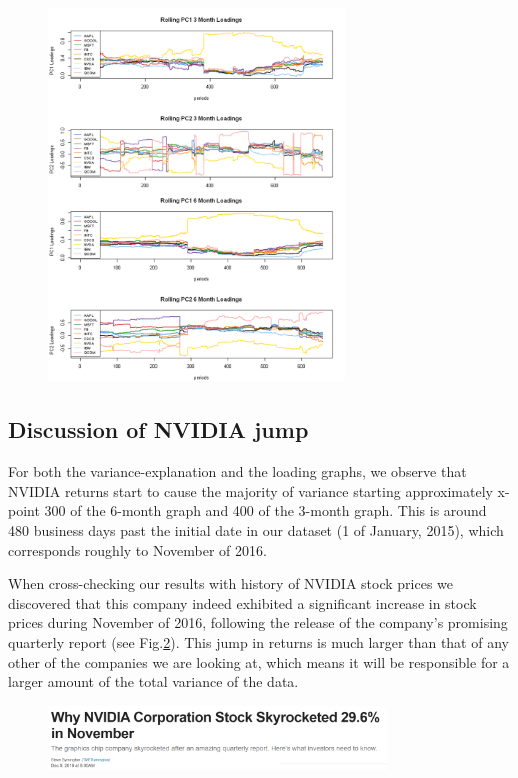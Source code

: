 \documentclass{article}
\begin{document}
\begin{figure}[H]
\caption{}
\centering
\includegraphics[width=0.7\textwidth]{36mload.png}
\label{3-6monthLoading}
\end{figure}


\subsection{Discussion of NVIDIA jump}

For both the variance-explanation and the loading graphs,  we observe that NVIDIA returns start to cause the majority of variance starting approximately x-point 300 of the 6-month graph and 400 of the 3-month graph. This is around 480 business days past the initial date in our dataset (1 of January, 2015), which corresponds roughly to November of 2016. 


When cross-checking our results with history of NVIDIA stock prices we discovered that this company indeed exhibited a significant increase in stock prices during November of 2016, following the release of the company's promising quarterly report (see Fig.\ref{news}). This jump in returns is much larger than that of any other of the companies we are looking at, which means it will be responsible for a larger amount of the total variance of the data.

\begin{figure}[H]
\caption{}
\centering
\includegraphics[width=0.8\textwidth]{Newspaper.png}
\label{news}
\end{figure}
\end{document}
